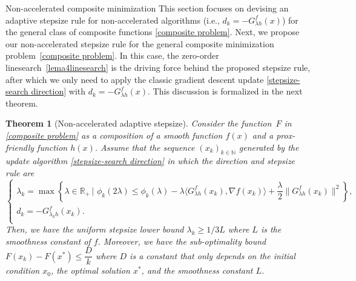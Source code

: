 \documentclass[11pt, a4paper, oneside, reqno]{amsart}
\makeatletter
\newtheorem{theorem}{Theorem}[section]
\def\subsection{\@startsection{subsection}{2}%
	\z@{.5\linespacing\@plus.7\linespacing}{.5\linespacing}%
	{\normalfont\large\bfseries}}
\makeatother
\begin{document}
\subsection{Non-accelerated composite minimization}
This section focuses on devising an adaptive stepsize rule for non-accelerated algorithms (i.e., $d_k = - G^{f}_{\lambda h}(x)$) for the general class of composite functions \eqref{composite problem}. Next, we propose our non-accelerated stepsize rule for the general composite minimization problem~\eqref{composite problem}. In this case, the zero-order linesearch~\ref{lema4linesearch} is the driving force behind the proposed stepsize rule, after which we only need to apply the classic gradient descent update \eqref{stepsize-search direction} with $d_k = - G^{f}_{\lambda h}(x)$. This discussion is formalized in the next theorem. 
\begin{theorem}[Non-accelerated adaptive stepsize]\label{theorem1}
Consider the function~$F$ in \eqref{composite problem} as a composition of a smooth function $f(x)$ and a prox-friendly function $h(x)$. Assume that the sequence $\left (x_k \right)_{k \in \mathbb{N}}$ generated by the update algorithm \eqref{stepsize-search direction} in which the direction and stepsize rule are
\begin{equation*}\label{alg:Algorithm1}
\tag{Alg.\,1}
\begin{cases}
  \lambda_k = \max\limits \left \{\lambda \in \mathbb{R}_+ \,|\,\, \phi_k(2\lambda) \leq \phi_k(\lambda) - \lambda \langle G^{f}_{\lambda h}(x_k), \nabla f(x_k) \rangle + \dfrac{\lambda}{2}\|G^{f}_{\lambda h}(x_k)\|^2\right\},\\      
  d_k = -G^{f}_{\lambda_k h}(x_k).\\
\end{cases}
\end{equation*}
Then, we have the uniform stepsize lower bound $\lambda_k \geq {1}/{3L}$ where $L$ is the smoothness constant of $f$. Moreover, we have the sub-optimality bound $F(x_k) - F(x^*) \leq \dfrac{D}{k}$ where $D$ is a constant that only depends on the initial condition $x_0$, the optimal solution $x^*$, and the smoothness constant $L$.
\end{theorem}
\end{document}
